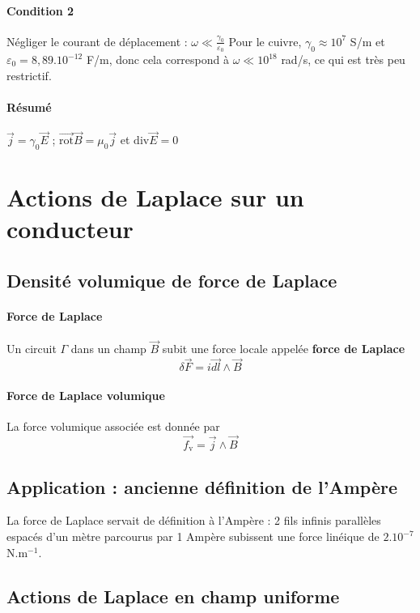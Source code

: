 \documentclass[french]{book}
\theoremstyle{plain}
\theoremstyle{definition}
\theoremstyle{remark}
\newcommand{\inv}{^{-1}}
\newcommand{\rot}{\overrightarrow{\text{rot}}}
\renewcommand{\div}{\text{div}}
\begin{document}
\paragraph{Condition 2} Négliger le courant de déplacement : $\omega\ll\displaystyle\frac{\gamma_0}{\varepsilon_0}$ Pour le cuivre, $\gamma_0\approx 10^7$ S/m et $\varepsilon_0=8,89.10^{-12}$ F/m, donc cela correspond à $\omega\ll 10^{18}$ rad/s, ce qui est très peu restrictif.
\paragraph{Résumé} $\overrightarrow{j}=\gamma_0\overrightarrow{E}$ ; $\rot\overrightarrow{B}=\mu_0\overrightarrow{j}$ et $\div\overrightarrow{E}=0$
\section{Actions de Laplace sur un conducteur}
\subsection{Densité volumique de force de Laplace}
\paragraph{Force de Laplace} Un circuit $\Gamma$ dans un champ $\overrightarrow{B}$ subit une force locale appelée \textbf{force de Laplace} $$\delta\overrightarrow{F}=i\overrightarrow{dl}\wedge\overrightarrow{B}$$ 
\paragraph{Force de Laplace volumique}La force volumique associée est donnée par $$\overrightarrow{f_\text{v}}=\overrightarrow{j}\wedge\overrightarrow{B}$$
\subsection{Application : ancienne définition de l'Ampère}
La force de Laplace servait de définition à l'Ampère : 2 fils infinis parallèles espacés d'un mètre parcourus par 1 Ampère subissent une force linéique de $2.10^{-7}$ N.m$\inv$.
\subsection{Actions de Laplace en champ uniforme}
\end{document}
